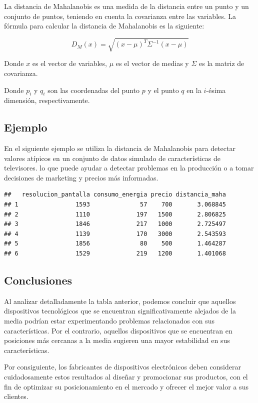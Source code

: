 \documentclass[
]{article}
\begin{document}
La distancia de Mahalanobis es una medida de la distancia entre un punto
y un conjunto de puntos, teniendo en cuenta la covarianza entre las
variables. La fórmula para calcular la distancia de Mahalanobis es la
siguiente:

\[ D_M(x) = \sqrt{(x - \mu)^T \Sigma^{-1} (x - \mu)} \]

Donde \(x\) es el vector de variables, \(\mu\) es el vector de medias y
\(\Sigma\) es la matriz de covarianza.

Donde \(p_i\) y \(q_i\) son las coordenadas del punto \(p\) y el punto
\(q\) en la \(i\)-ésima dimensión, respectivamente.

\hypertarget{ejemplo-5}{%
\subsection{Ejemplo}\label{ejemplo-5}}

En el siguiente ejemplo se utiliza la distancia de Mahalanobis para
detectar valores atípicos en un conjunto de datos simulado de
características de televisores. lo que puede ayudar a detectar problemas
en la producción o a tomar decisiones de marketing y precios más
informadas.

\begin{verbatim}
##   resolucion_pantalla consumo_energia precio distancia_maha
## 1                1593              57    700       3.068845
## 2                1110             197   1500       2.806825
## 3                1846             217   1000       2.725497
## 4                1139             170   3000       2.543593
## 5                1856              80    500       1.464287
## 6                1529             219   1200       1.401068
\end{verbatim}

\hypertarget{conclusiones-1}{%
\subsection{Conclusiones}\label{conclusiones-1}}

Al analizar detalladamente la tabla anterior, podemos concluir que
aquellos dispositivos tecnológicos que se encuentran significativamente
alejados de la media podrían estar experimentando problemas relacionados
con sus características. Por el contrario, aquellos dispositivos que se
encuentran en posiciones más cercanas a la media sugieren una mayor
estabilidad en sus características.

Por consiguiente, los fabricantes de dispositivos electrónicos deben
considerar cuidadosamente estos resultados al diseñar y promocionar sus
productos, con el fin de optimizar su posicionamiento en el mercado y
ofrecer el mejor valor a sus clientes.
\end{document}
